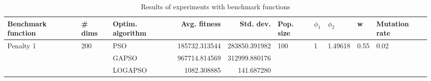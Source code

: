 \begin{table}
\centering
\caption{Results of experiments with benchmark functions}
\begin{tabular}{lllrrlllll}
\toprule
        Benchmark function &              \# dims & Optim. algorithm &  Avg. fitness &     Std. dev. &            Pop. size &         $\phi_{1}$ &               $\phi_{2}$ &                     w &         Mutation rate \\
\midrule
\multirow{3}{*}{Penalty 1} & \multirow{3}{*}{200} &              PSO & 185732.313544 & 283850.391982 & \multirow{3}{*}{100} & \multirow{3}{*}{1} & \multirow{3}{*}{1.49618} & \multirow{3}{*}{0.55} & \multirow{3}{*}{0.02} \\
                           &                      &            GAPSO & 967714.814569 & 312999.880176 &                      &                    &                          &                       &                       \\
                           &                      &          LOGAPSO &   1082.308885 &    141.687280 &                      &                    &                          &                       &                       \\
\bottomrule
\end{tabular}
\end{table}
